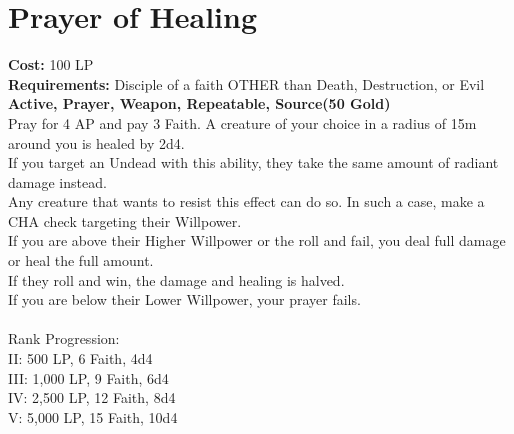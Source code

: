 \section{Prayer of Healing}\label{prayer:healing}
\textbf{Cost:} 100 LP\\
\textbf{Requirements:} Disciple of a faith OTHER than Death, Destruction, or Evil\\
\textbf{Active, Prayer, Weapon, Repeatable, Source(50 Gold)}\\
Pray for 4 AP and pay 3 Faith.
A creature of your choice in a radius of 15m around you is healed by 2d4.\\
If you target an Undead with this ability, they take the same amount of radiant damage instead.\\
Any creature that wants to resist this effect can do so.
In such a case, make a CHA check targeting their Willpower.\\
If you are above their Higher Willpower or the roll and fail, you deal full damage or heal the full amount.\\
If they roll and win, the damage and healing is halved.\\
If you are below their Lower Willpower, your prayer fails.\\
\\
Rank Progression:\\
II: 500 LP, 6 Faith, 4d4\\
III: 1,000 LP, 9 Faith, 6d4\\
IV: 2,500 LP, 12 Faith, 8d4\\
V: 5,000 LP, 15 Faith, 10d4\\